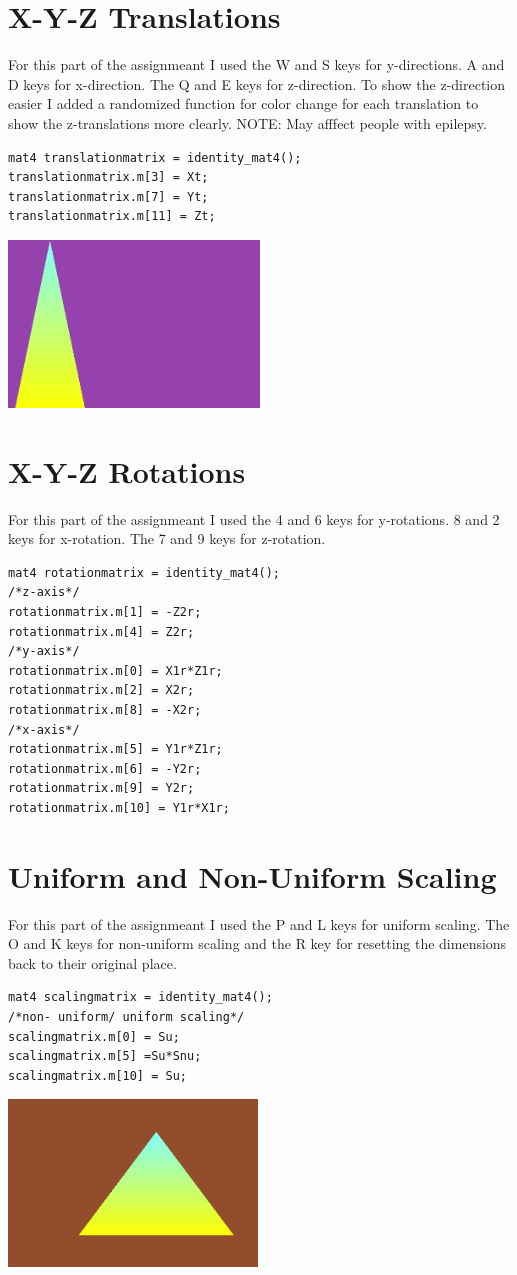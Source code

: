 \documentclass{article}
\begin{document}
\section{X-Y-Z Translations}
For this part of the assignmeant I used the W and S keys for y-directions. A and D keys for x-direction. The Q and E keys for z-direction. To show the z-direction easier I added a randomized function for color change for each translation to show the z-translations more clearly. NOTE: May afffect people with epilepsy.
\begin{lstlisting}
mat4 translationmatrix = identity_mat4();
translationmatrix.m[3] = Xt;
translationmatrix.m[7] = Yt;
translationmatrix.m[11] = Zt;
\end{lstlisting}
\includegraphics[height=1.75in]{scaling2.PNG}

\section{X-Y-Z Rotations}
For this part of the assignmeant I used the 4 and 6 keys for y-rotations. 8 and 2 keys for x-rotation. The 7 and 9 keys for z-rotation. 
\begin{lstlisting}
mat4 rotationmatrix = identity_mat4();
/*z-axis*/
rotationmatrix.m[1] = -Z2r;
rotationmatrix.m[4] = Z2r;
/*y-axis*/
rotationmatrix.m[0] = X1r*Z1r;
rotationmatrix.m[2] = X2r;
rotationmatrix.m[8] = -X2r;
/*x-axis*/
rotationmatrix.m[5] = Y1r*Z1r;
rotationmatrix.m[6] = -Y2r;
rotationmatrix.m[9] = Y2r;
rotationmatrix.m[10] = Y1r*X1r;
\end{lstlisting}

\section{Uniform and Non-Uniform Scaling}
For this part of the assignmeant I used the P and L keys for uniform scaling. The O and K keys for non-uniform scaling and the R key for resetting the dimensions back to their original place. 
\begin{lstlisting}
mat4 scalingmatrix = identity_mat4();
/*non- uniform/ uniform scaling*/
scalingmatrix.m[0] = Su;
scalingmatrix.m[5] =Su*Snu;
scalingmatrix.m[10] = Su;
\end{lstlisting}
\includegraphics[height=1.75in]{scaling.PNG}
\end{document}
